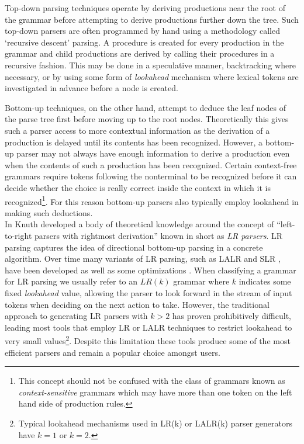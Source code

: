\documentclass[envcountsame,runningheads]{llncs}
\begin{document}
Top-down parsing techniques operate by deriving productions near the root of the grammar before attempting to derive productions further down the tree.
Such top-down parsers are often programmed by hand using a methodology called `recursive descent' parsing.
A procedure is created for every production in the grammar and child productions are derived by calling their procedures in a recursive fashion.
This may be done in a speculative manner, backtracking where necessary, or by using some form of \emph{lookahead} mechanism where lexical tokens are investigated in advance before a node is created.

Bottom-up techniques, on the other hand, attempt to deduce the leaf nodes of the parse tree first before moving up to the root nodes. 
Theoretically this gives such a parser access to more contextual information %
as the derivation of a production is delayed until its contents has been recognized.
However, a bottom-up parser may not always have enough information to derive a production even when the contents of such a production has been recognized. 
Certain context-free grammars require tokens following the nonterminal to be recognized before it can decide whether the choice is really correct inside the context in which it is recognized\footnote{This concept should not be confused with the class of grammars known as \emph{context-sensitive} grammars which may have more than one token on the left hand side of production rules.}.
For this reason bottom-up parsers also typically employ lookahead in making such deductions.\\

In \cite{knuth65} Knuth developed a body of theoretical knowledge around the concept of ``left-to-right parsers with rightmost derivation'' known in short as \emph{LR parsers}. 
LR parsing captures the idea of directional bottom-up parsing in a concrete algorithm.
Over time many variants of LR parsing, such as LALR and SLR \cite{362625}, have been developed as well as some optimizations \cite{13326}.
When classifying a grammar for LR parsing we usually refer to an $LR(k)$ grammar where $k$ indicates some fixed \emph{lookahead} value, allowing the parser to look forward in the stream of input tokens when deciding on the next action to take.
However, the traditional approach to generating LR parsers with $k > 2$ has proven prohibitively difficult, leading most tools that employ LR or LALR techniques to restrict lookahead to very small values\footnote{Typical lookahead mechanisms used in LR(k) or LALR(k) parser generators have $k = 1$ or $k = 2$.}.
Despite this limitation these tools produce some of the most efficient parsers and remain a popular choice amongst users.
\end{document}
